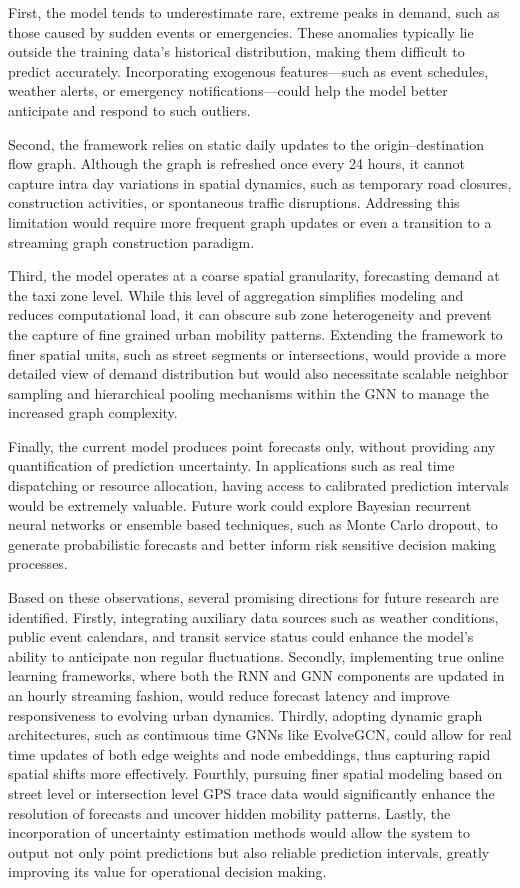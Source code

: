 \documentclass{article}
\begin{document}
First, the model tends to underestimate rare, extreme peaks in demand, such as those caused by sudden events or emergencies. These anomalies typically lie outside the training data's historical distribution, making them difficult to predict accurately. Incorporating exogenous features—such as event schedules, weather alerts, or emergency notifications—could help the model better anticipate and respond to such outliers.

Second, the framework relies on static daily updates to the origin–destination flow graph. Although the graph is refreshed once every 24 hours, it cannot capture intra day variations in spatial dynamics, such as temporary road closures, construction activities, or spontaneous traffic disruptions. Addressing this limitation would require more frequent graph updates or even a transition to a streaming graph construction paradigm.

Third, the model operates at a coarse spatial granularity, forecasting demand at the taxi zone level. While this level of aggregation simplifies modeling and reduces computational load, it can obscure sub zone heterogeneity and prevent the capture of fine grained urban mobility patterns. Extending the framework to finer spatial units, such as street segments or intersections, would provide a more detailed view of demand distribution but would also necessitate scalable neighbor sampling and hierarchical pooling mechanisms within the GNN to manage the increased graph complexity.

Finally, the current model produces point forecasts only, without providing any quantification of prediction uncertainty. In applications such as real time dispatching or resource allocation, having access to calibrated prediction intervals would be extremely valuable. Future work could explore Bayesian recurrent neural networks or ensemble based techniques, such as Monte Carlo dropout, to generate probabilistic forecasts and better inform risk sensitive decision making processes.

Based on these observations, several promising directions for future research are identified. Firstly, integrating auxiliary data sources such as weather conditions, public event calendars, and transit service status could enhance the model’s ability to anticipate non regular fluctuations. Secondly, implementing true online learning frameworks, where both the RNN and GNN components are updated in an hourly streaming fashion, would reduce forecast latency and improve responsiveness to evolving urban dynamics. Thirdly, adopting dynamic graph architectures, such as continuous time GNNs like EvolveGCN, could allow for real time updates of both edge weights and node embeddings, thus capturing rapid spatial shifts more effectively. Fourthly, pursuing finer spatial modeling based on street level or intersection level GPS trace data would significantly enhance the resolution of forecasts and uncover hidden mobility patterns. Lastly, the incorporation of uncertainty estimation methods would allow the system to output not only point predictions but also reliable prediction intervals, greatly improving its value for operational decision making.
\end{document}
